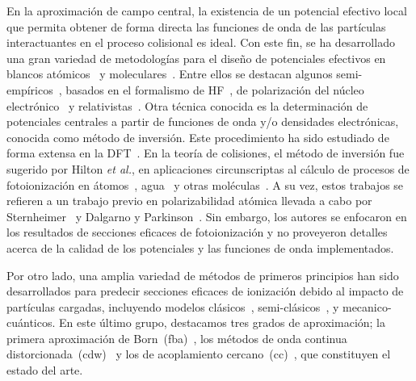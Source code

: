 En la aproximación de campo central, la existencia de un potencial 
efectivo local que permita obtener de forma directa las funciones de 
onda de las partículas interactuantes en el proceso colisional es ideal.
Con este fin, se ha desarrollado una gran variedad de metodologías para 
el diseño de potenciales efectivos en blancos atómicos~\cite{Hibbert:82} 
y moleculares~\cite{Menchero:10,Granados:16}. Entre ellos se destacan 
algunos semi-empíricos~\cite{falta}, basados en el formalismo de 
HF~\cite{falta}, de polarización del núcleo electrónico~\cite{falta} y 
relativistas~\cite{falta}. Otra técnica conocida es la determinación de 
potenciales centrales a partir de funciones de onda y/o densidades 
electrónicas, conocida como método de inversión. Este procedimiento ha 
sido estudiado de forma extensa en la DFT~\cite{Wu:03,Gaiduk:13,
Ryabinkin:15,Schipper:97,deSilva:12,Kananenka:13,Mura:97,Jacob:11}. 
En la teoría de colisiones, el método de inversión fue sugerido por 
Hilton \textit{et al.}, en aplicaciones circunscriptas al cálculo de 
procesos de fotoionización en átomos~\cite{Hilton:77,Suzer:77}, 
agua~\cite{Hilton:79} y otras moléculas~\cite{Hilton:80,Crljen:87}. A su 
vez, estos trabajos se refieren a un trabajo previo en polarizabilidad 
atómica llevada a cabo por Sternheimer~\cite{Sternheimer:54} y Dalgarno 
y Parkinson~\cite{Dalgarno:59}. Sin embargo, los autores se enfocaron en 
los resultados de secciones eficaces de fotoionización y no proveyeron 
detalles acerca de la calidad de los potenciales y las funciones de 
onda implementados.

Por otro lado, una amplia variedad de métodos de primeros principios han 
sido desarrollados para predecir secciones eficaces de ionización debido 
al impacto de partículas cargadas, incluyendo modelos 
clásicos~\cite{falta}, semi-clásicos~\cite{falta}, y mecanico-cuánticos. 
En este último grupo, destacamos tres grados de aproximación; la primera 
aproximación de Born~(\acs{fba})~\cite{Bates:62,McDowell:61}, los 
métodos de onda continua distorcionada~(\acs{cdw})~\cite{Crothers:10,
Rivarola:87} y los de acoplamiento cercano~(\acs{cc})~\cite{Pindzola:07,
Burke:11,Pindzola:16,Bray:17}, que constituyen el estado del arte.

